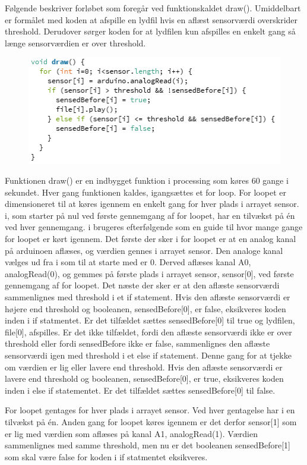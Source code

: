 Følgende beskriver forløbet som foregår ved funktionskaldet draw(). Umiddelbart er formålet med koden at afspille en lydfil hvis en aflæst sensorværdi overskrider threshold. Derudover sørger koden for at lydfilen kun afspilles en enkelt gang så længe sensorværdien er over threshold. 

\begin{figure}[H]
\includegraphics[scale=0.8]{Figure/programkode04.png}
\end{figure}  

Funktionen draw() er en indbygget funktion i processing som køres 60 gange i sekundet. 
Hver gang funktionen kaldes, igangsættes et for loop. For loopet er dimensioneret til at køres igennem en enkelt gang for hver plads i arrayet sensor. i, som starter på nul ved første gennemgang af for loopet, har en tilvækst på én ved hver gennemgang. i brugeres efterfølgende som en guide til hvor mange gange for loopet er kørt igennem. 
Det første der sker i for loopet er at en analog kanal på arduinoen aflæses, og værdien gennes i arrayet sensor. Den analoge kanal vælges ud fra i som til at starte med er 0. Derved aflæses kanal A0, analogRead(0), og gemmes på første plads i arrayet sensor, sensor[0], ved første gennemgang af for loopet. 
Det næste der sker er at den aflæste sensorværdi sammenlignes med threshold i et if statement. Hvis den aflæste sensorværdi er højere end threshold og booleanen, sensedBefore[0], er false, eksikveres koden inden i if statmentet. Er det tilfældet sættes sensedBefore[0] til true og lydfilen, file[0], afspilles.
Er det ikke tilfældet, fordi den aflæste sensorværdi ikke er over threshold eller fordi sensedBefore ikke er false, sammenlignes den aflæste sensorværdi igen med threshold i et else if statement. Denne gang for at tjekke om værdien er lig eller lavere end threshold. Hvis den aflæste sensorværdi er lavere end threshold og booleanen, sensedBefore[0], er true, eksikveres koden inden i else if statementet. Er det tilfældet sættes sensedBefore[0] til false.

For loopet gentages for hver plads i arrayet sensor. Ved hver gentagelse har i en tilvækst på én. Anden gang for loopet køres igennem er det derfor sensor[1] som er lig med værdien som aflæses på kanal A1, analogRead(1). Værdien sammenlignes med samme threshold, men nu er det booleanen sensedBefore[1] som skal være false for koden i if statmentet eksikveres. 

